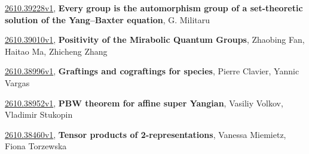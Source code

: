 \documentclass[9pt, a4paper]{article}
\theoremstyle{plain}
\theoremstyle{definition}
\theoremstyle{remark}
\newcommand{\arxiv}[3]{\href{https://arxiv.org/abs/#1}{#1}, \textbf{\textcolor{arxivblue}{#2}}, #3}
\begin{document}
\arxiv{2610.39228v1}{Every group is the automorphism group of a set-theoretic solution of the Yang--Baxter equation}{G. Militaru}

\arxiv{2610.39010v1}{Positivity of the Mirabolic Quantum Groups}{Zhaobing Fan, Haitao Ma, Zhicheng Zhang}

\arxiv{2610.38996v1}{Graftings and cograftings for species}{Pierre Clavier, Yannic Vargas}

\arxiv{2610.38952v1}{PBW theorem for affine super Yangian}{Vasiliy Volkov, Vladimir Stukopin}

\arxiv{2610.38460v1}{Tensor products of 2-representations}{Vanessa Miemietz, Fiona Torzewska}

\end{document}
